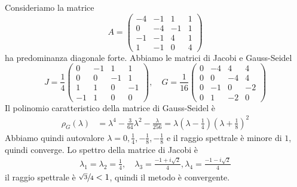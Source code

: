 \documentclass[a4paper]{article}
\begin{document}
\begin{snippetexample}{}
    Consideriamo la matrice
    \[
        A =
        \begin{pmatrix}
            -4 & -1 & 1 & 1 \\
            0 & -4 & -1 & 1 \\
            -1 & -1 & 4 & 1 \\
            1 & -1 & 0 & 4
        \end{pmatrix}
    \]
    ha predominanza diagonale forte.
    Abbiamo le matrici di Jacobi e Gauss-Seidel \[
        J = \frac14
        \begin{pmatrix}
            0 & -1 & 1 & 1 \\
            0 & 0 & -1 & 1 \\
            1 & 1 & 0 & -1 \\
            -1 & 1 & 0 & 0
        \end{pmatrix},
        \quad
        G = \frac{1}{16}
        \begin{pmatrix}
            0 & -4 & 4 & 4 \\
            0 & 0 & -4 & 4 \\
            0 & -1 & 0 & -2 \\
            0 & 1 & -2 & 0
        \end{pmatrix}
    \]
    Il polinomio caratteristico della matrice di Gauss-Seidel è
    \begin{align*}
        \rho_G(\lambda)
        &= \lambda^4 - \frac{3}{64}\lambda^2
        - \frac{\lambda}{256} = \lambda\left(\lambda - \frac14\right)
        \left(\lambda + \frac18\right)^2
    \end{align*}
    Abbiamo quindi autovalore \(\lambda = 0, \frac14, -\frac18, -\frac18\)
    e il raggio spettrale è minore di \(1\), quindi converge.
    Lo spettro della matrice di Jacobi è
    \begin{align*}
        \lambda_1 = \lambda_2 = \frac14, \quad
        \lambda_3 = \frac{-1 + i\sqrt{2}}{4},
        \lambda_4 = \frac{-1 - i\sqrt{2}}{4}
    \end{align*}
    il raggio spettrale è \(\sfrac{\sqrt{3}}{4} < 1\), quindi il metodo è convergente.
\end{snippetexample}
\end{document}
